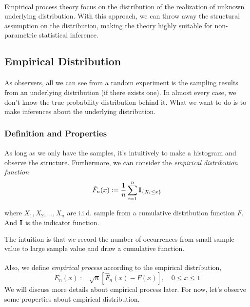 \documentclass[final_project_1.tex]{subfiles}
\begin{document}
\paragraph{}
Empirical process theory focus on the distribution of the realization of unknown underlying distribution. With this approach, we can throw away the structural assumption on the distribution, making the theory highly suitable for non-parametric statistical inference.
\subsection{Empirical Distribution}
\paragraph{}
As observers, all we can see from a random experiment is the sampling results from an underlying distribution (if there exists one). In almost every case, we don't know the true probability distribution behind it. What we want to do is to make inferences about the underlying distribution.

\subsubsection{Definition and Properties}
\paragraph{}
As long as we only have the samples, it's intuitively to make a histogram and observe the structure. Furthermore, we can consider the {\it empirical distribution function}
$$\hat{F}_n(x):=\frac{1}{n}\sum^{n}_{i=1}{\bf I}_{\{X_i\leq x\}}$$

where $X_1, X_2, ..., X_n$ are i.i.d. sample from a cumulative distribution function $F$. And ${\bf I}$ is the indicator function.

The intuition is that we record the number of occurrences from small sample value to large sample value and draw a cumulative function.

\paragraph{}
Also, we define {\it empirical process} according to the empirical distribution,
$$E_n(x):=\sqrt{n}[\hat{F}_n(x)-F(x)],\quad 0\leq x\leq 1$$
We will discuss more details about empirical process later. For now, let's observe some properties about empirical distribution.
\end{document}
